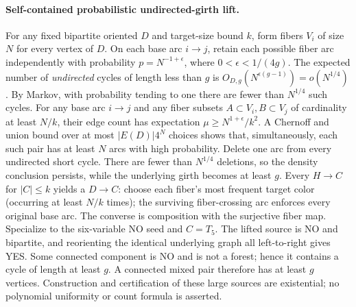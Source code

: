 \documentclass[11pt]{article}
\begin{document}
\paragraph{Self-contained probabilistic undirected-girth lift.}
For any fixed bipartite oriented $D$ and target-size bound
$k$, form fibers $V_i$ of size $N$ for every vertex of $D$.
On each base arc $i\to j$, retain each possible fiber
arc independently with probability
$p=N^{-1+\epsilon}$, where $0<\epsilon<1/(4g)$.
The expected number of \emph{undirected} cycles of
length less than $g$ is
$O_{D,g}(N^{\epsilon(g-1)})=o(N^{1/4})$.
By Markov, with probability tending to one there
are fewer than $N^{1/4}$ such cycles.
For any base arc $i\to j$ and any fiber subsets
$A\subset V_i,B\subset V_j$ of cardinality at least
$N/k$, their edge count has expectation
$\mu\ge N^{1+\epsilon}/k^2$.
A Chernoff and union bound over at most
$|E(D)|4^N$ choices shows that, simultaneously,
each such pair has at least $N$ arcs with high
probability. Delete one arc from every undirected
short cycle. There are fewer than $N^{1/4}$ deletions,
so the density conclusion persists, while the
underlying girth becomes at least $g$.
Every $H\to C$ for $|C|\le k$ yields a $D\to C$:
choose each fiber's most frequent target color
(occurring at least $N/k$ times); the surviving
fiber-crossing arc enforces every original base arc.
The converse is composition with the surjective
fiber map. Specialize to the six-variable NO
seed and $C=T_5$. The lifted source is NO
and bipartite, and reorienting the identical
underlying graph all left-to-right gives YES.
Some connected component is NO and is not a forest;
hence it contains a cycle of length at least $g$.
A connected mixed pair therefore has at least $g$
vertices. Construction and certification of these
large sources are existential; no polynomial uniformity
or count formula is asserted.
\end{document}
